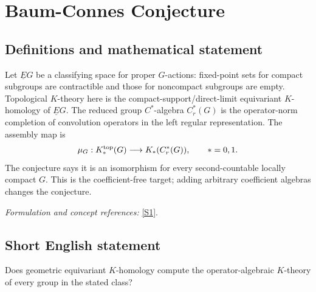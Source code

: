 \documentclass[11pt]{article}
\newcommand{\sref}[2]{\hyperlink{source:#1:#2}{[S#2]}}
\newif\ifshowcatalogue
\newcommand{\cataloguescope}[1]{\ifshowcatalogue
 \paragraph{Exact scope in the supplied catalogue.}
 \begin{quote}\small #1\end{quote}\fi}
\begin{document}
\setcounter{section}{0}
\clearpage
\section*{\texorpdfstring{Baum-Connes Conjecture}{Baum-Connes Conjecture}}\label{1479}
\subsection{Definitions and mathematical statement}
Let $\underline EG$ be a classifying space for proper $G$-actions: fixed-point sets for compact subgroups are contractible and those for noncompact subgroups are empty. Topological $K$-theory here is the compact-support/direct-limit equivariant $K$-homology of $\underline EG$. The reduced group $C^*$-algebra $C_r^*(G)$ is the operator-norm completion of convolution operators in the left regular representation. The assembly map is
\[
 \mu_G:K_*^{\rm top}(G)\longrightarrow K_*(C_r^*(G)),\qquad *=0,1.
\]
The conjecture says it is an isomorphism for every second-countable locally compact $G$. This is the coefficient-free target; adding arbitrary coefficient algebras changes the conjecture.
\par\smallskip\textit{Formulation and concept references:} \sref{1479}{1}.
\cataloguescope{Prove the Baum-Connes conjecture for every second-countable locally compact group G: the assembly map K\_top(G) \ensuremath{\to} K(C*\_r(G)) from the topological K-theory of the group, built from the classifying space for proper actions, to the K-theory of the reduced group C*-algebra is an isomorphism.}

\subsection{Short English statement}
Does geometric equivariant $K$-homology compute the operator-algebraic $K$-theory of every group in the stated class?
\end{document}
